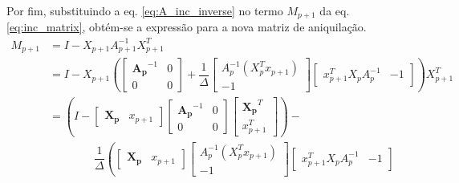 Por fim, substituindo a eq. \ref{eq:A_inc_inverse} no termo $M_{p+1}$ da eq. \ref{eq:inc_matrix}, obtém-se
a expressão para a nova matriz de aniquilação.
\smallskip
\begin{equation}
    \begin{split}
        M_{p+1} &= I - X_{p+1} A_{p+1}^{-1} X_{p+1}^T \\ 
                &=  I - X_{p+1} \left(
                \begin{bmatrix} 
                    \mathbf{A_p}^{-1} & 0 \\ 
                    0 & 0 
                \end{bmatrix} + \dfrac{1}{\Delta}
                \begin{bmatrix} 
                    A_p^{-1} (X_p^T x_{p+1}) \\ 
                    -1 
                \end{bmatrix}
                \begin{bmatrix} 
                    x_{p+1}^T X_p A_p^{-1} & -1           
                \end{bmatrix}\right) X_{p+1}^T \\
                &= \left( I - 
                \begin{bmatrix} 
                    \mathbf{X_p} & x_{p+1}
                \end{bmatrix}
                \begin{bmatrix} 
                    \mathbf{A_p}^{-1} & 0 \\ 
                    0 & 0 
                \end{bmatrix}
                \begin{bmatrix} 
                    \mathbf{X_p}^T \\ 
                    x_{p+1}^T
                \end{bmatrix} \right) - \\ &\qquad \qquad \dfrac{1}{\Delta} \left(
                \begin{bmatrix} 
                    \mathbf{X_p} & x_{p+1}
                \end{bmatrix}
                \begin{bmatrix} 
                    A_p^{-1} (X_p^T x_{p+1}) \\
                    -1 
                \end{bmatrix}
                \begin{bmatrix} 
                    x_{p+1}^T X_p A_p^{-1} & -1           

\end{bmatrix}
\end{split}
\end{equation}
